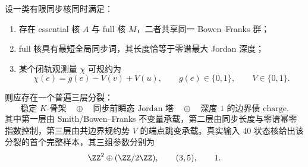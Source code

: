 \begin{conjecture}\label{conj:conclusion-realinput40-k-jordan-boundarydebt-triple-split}
设一类有限同步核同时满足：
\begin{enumerate}
  \item 存在 essential 核 \(A\) 与 full 核 \(M\)，二者共享同一 Bowen--Franks 群；
  \item full 核具有最短全局同步词，其长度恰等于零谱最大 Jordan 深度；
  \item 某个闭轨观测量 \(\chi\) 可规约为
  \[
  \chi(e)=g(e)-V(v)+V(u),
  \qquad
  g(e)\in\{0,1\},
  \qquad
  V\in\{0,1\}.
  \]
\end{enumerate}
则应存在一个普遍三层分裂：
\[
\boxed{\text{稳定 }K\text{-骨架}}
\quad\oplus\quad
\boxed{\text{同步前瞬态 Jordan 塔}}
\quad\oplus\quad
\boxed{\text{深度 }1\text{ 的边界债 charge}}.
\]
其中第一层由 Smith/Bowen--Franks 不变量承载，第二层由同步长度与零谱幂零指数控制，第三层由共边界规约势 \(V\) 的端点跳变承载。真实输入 \(40\) 状态核给出该分裂的首个完整样本，其三组参数分别为
\[
\ZZ^2\oplus(\ZZ/2\ZZ),\qquad (3,5),\qquad 1.
\]
\end{conjecture}

\endinput
